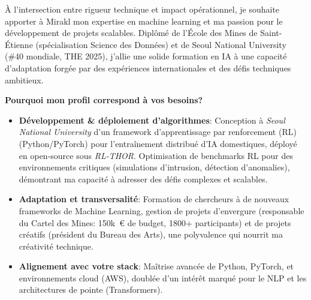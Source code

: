 
\newcommand{\Company}{Mirakl Labs}
\recipient{\RecruitmentTeam{\Company}}{\Company\\Paris\\France}
\date{21 Mars 2025}
\makelettertitle

À l'intersection entre rigueur technique et impact opérationnel, je souhaite apporter à Mirakl mon expertise en machine learning et ma passion pour le développement de projets scalables. Diplômé de l'École des Mines de Saint-Étienne (spécialisation Science des Données) et de Seoul National University (\#40 mondiale, THE 2025), j'allie une solide formation en IA à une capacité d'adaptation forgée par des expériences internationales et des défis techniques ambitieux.

\textbf{Pourquoi mon profil correspond à vos besoins?}
\begin{itemize}
    \item \textbf{Développement \& déploiement d'algorithmes}:
          Conception à \textit{Seoul National University} d'un framework d'apprentissage par renforcement (RL) (Python/PyTorch) pour l'entraînement distribué d'IA domestiques, déployé en open-source sous \textit{RL-THOR}.
          Optimisation de benchmarks RL pour des environnements critiques (simulations d'intrusion, détection d'anomalies), démontrant ma capacité à adresser des défis complexes et scalables.
    \item \textbf{Adaptation et transversalité}: Formation de chercheurs à de nouveaux frameworks de Machine Learning, gestion de projets d'envergure (responsable du Cartel des Mines: 150k~€ de budget, 1800+ participants) et de projets créatifs (président du Bureau des Arts), une polyvalence qui nourrit ma créativité technique.
    \item \textbf{Alignement avec votre stack}: Maîtrise avancée de Python, PyTorch, et environnements cloud (AWS), doublée d'un intérêt marqué pour le NLP et les architectures de pointe (Transformers).
\end{itemize}
\vspace{7pt}

